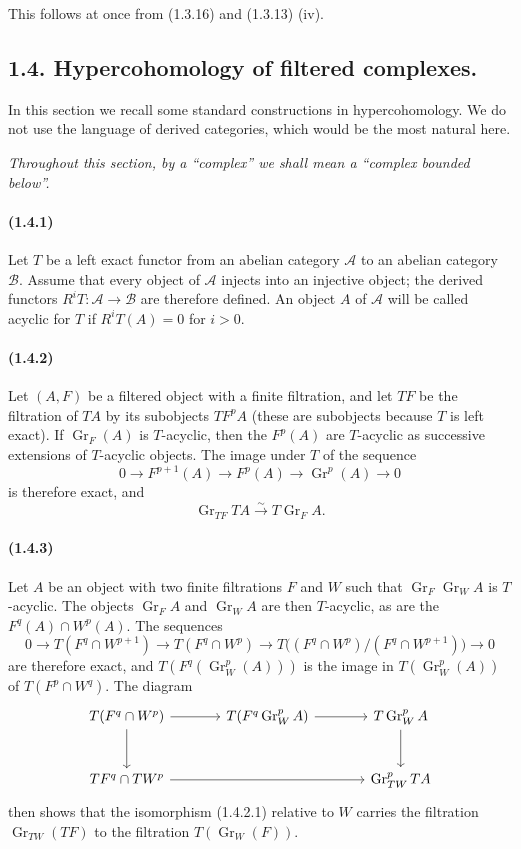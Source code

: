 \documentclass[10pt]{article}
\newcommand{\Gr}{\operatorname{Gr}}
\newcommand{\calA}{\mathcal A}
\newcommand{\calB}{\mathcal B}
\newcommand{\iso}{\xrightarrow{\sim}}
\begin{document}
This follows at once from (1.3.16) and (1.3.13) (iv).

\subsection*{1.4. Hypercohomology of filtered complexes.}

In this section we recall some standard constructions in hypercohomology. We do not use the language of derived categories, which would be the most natural here.

\emph{Throughout this section, by a ``complex'' we shall mean a ``complex bounded below''.}

\paragraph{(1.4.1)} Let $T$ be a left exact functor from an abelian category $\calA$ to an abelian category $\calB$. Assume that every object of $\calA$ injects into an injective object; the derived functors $R^iT:\calA\to\calB$ are therefore defined. An object $A$ of $\calA$ will be called acyclic for $T$ if $R^iT(A)=0$ for $i>0$.

\paragraph{(1.4.2)} Let $(A,F)$ be a filtered object with a finite filtration, and let $TF$ be the filtration of $TA$ by its subobjects $TF^pA$ (these are subobjects because $T$ is left exact). If $\Gr_F(A)$ is $T$-acyclic, then the $F^p(A)$ are $T$-acyclic as successive extensions of $T$-acyclic objects. The image under $T$ of the sequence
\[
0\to F^{p+1}(A)\to F^p(A)\to\Gr^p(A)\to0
\]
is therefore exact, and
\[
\tag{1.4.2.1}
\Gr_{TF}TA\iso T\Gr_FA.
\]

\paragraph{(1.4.3)} Let $A$ be an object with two finite filtrations $F$ and $W$ such that $\Gr_F\Gr_WA$ is $T$-acyclic. The objects $\Gr_FA$ and $\Gr_WA$ are then $T$-acyclic, as are the $F^q(A)\cap W^p(A)$. The sequences
\[
0\to T(F^q\cap W^{p+1})\to T(F^q\cap W^p)\to T\bigl((F^q\cap W^p)/(F^q\cap W^{p+1})\bigr)\to0
\]
are therefore exact, and $T(F^q(\Gr_W^p(A)))$ is the image in $T(\Gr_W^p(A))$ of $T(F^p\cap W^q)$. The diagram
\[
\begin{tikzcd}[column sep=large,row sep=large]
T(F^q\cap W^p) \arrow[r] \arrow[d] & T(F^q\Gr_W^pA) \arrow[r] & T\Gr_W^pA \arrow[d]\\
TF^q\cap TW^p \arrow[rr] && \Gr_{TW}^pTA
\end{tikzcd}
\]
then shows that the isomorphism (1.4.2.1) relative to $W$ carries the filtration $\Gr_{TW}(TF)$ to the filtration $T(\Gr_W(F))$.
\end{document}
